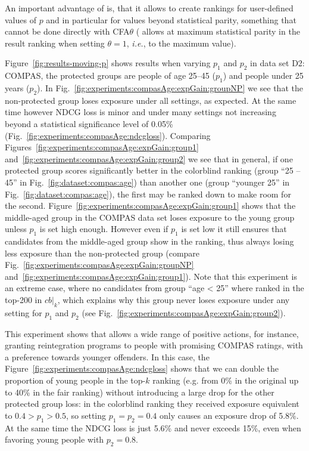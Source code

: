 %
An important advantage of \algoFAIR is, that it allows to create rankings for user-defined values of $p$ and in particular for values beyond statistical parity, something that cannot be done directly with CFA$\theta$ (\citet{zehlike2020matching} allows at maximum statistical parity in the result ranking when setting $\theta=1$, {\it i.e.}, to the maximum value).

Figure~\ref{fig:results-moving-p} shows results when varying $p_1$ and $p_2$ in data set D2: COMPAS, the protected groups are people of age 25--45 ($p_1$) and people under 25 years ($p_2$).
%
In Fig.~\ref{fig:experiments:compasAge:expGain:groupNP} we see that the non-protected group loses exposure under all settings, as expected.
%
At the same time however NDCG loss is minor and under many settings not increasing beyond a statistical significance level of 0.05\% (Fig.~\ref{fig:experiments:compasAge:ndcgloss}).
%
Comparing Figures~\ref{fig:experiments:compasAge:expGain:group1} and~\ref{fig:experiments:compasAge:expGain:group2} we see that in general, if one protected group scores significantly better in the colorblind ranking (group ``25 -- 45'' in Fig.~\ref{fig:dataset:compas:age}) than another one (group ``younger 25'' in Fig.~\ref{fig:dataset:compas:age}), the first may be ranked down to make room for the second.
%
Figure~\ref{fig:experiments:compasAge:expGain:group1} shows that the middle-aged group in the COMPAS data set loses exposure to the young group unless $p_1$ is set high enough.
%
However even if $p_1$ is set low it still ensures that candidates from the middle-aged group show in the ranking, thus always losing less exposure than the non-protected group (compare Fig.~\ref{fig:experiments:compasAge:expGain:groupNP} and~\ref{fig:experiments:compasAge:expGain:group1}).
%
Note that this experiment is an extreme case, where no candidates from group ``age < 25'' where ranked in the top-200 in $cb|_k$, which explains why this group never loses exposure under any setting for $p_1$ and $p_2$ (see Fig.~\ref{fig:experiments:compasAge:expGain:group2}).

This experiment shows that \algoFAIR allows a wide range of positive actions, for instance, granting reintegration programs to people with promising COMPAS ratings, with a preference towards younger offenders.
%
In this case, the Figure~\ref{fig:experiments:compasAge:ndcgloss} shows that we can double the proportion of young people in the top-$k$ ranking (e.g. from 0\% in the original up to 40\% in the fair ranking) without introducing a large drop for the other protected group loss: in the colorblind ranking they received exposure equivalent to $0.4 > p_1 > 0.5$, so setting $p_1 = p_2 = 0.4$ only causes an exposure drop of 5.8\%.
%
At the same time the NDCG loss is just 5.6\% and never exceeds 15\%, even when favoring young people with $p_2=0.8$.
